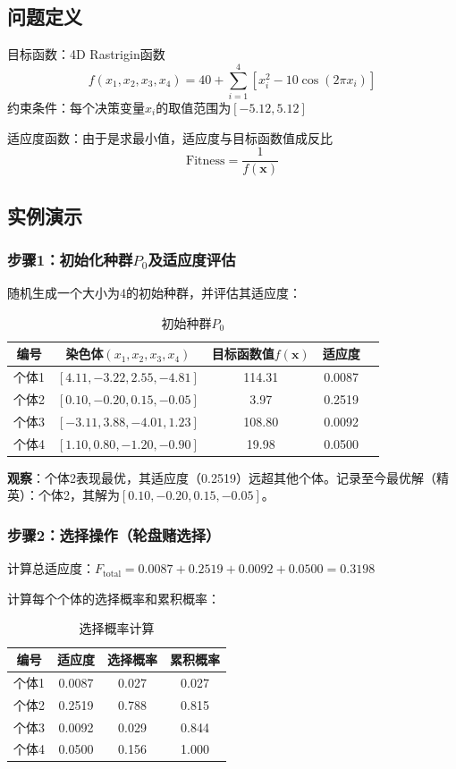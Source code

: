 \subsection{问题定义}

目标函数：4D Rastrigin函数
\[
f(x_1, x_2, x_3, x_4) = 40 + \sum_{i=1}^{4} [x_i^2 - 10 \cos(2\pi x_i)]
\]
约束条件：每个决策变量$x_i$的取值范围为$[-5.12, 5.12]$

适应度函数：由于是求最小值，适应度与目标函数值成反比
\[
\text{Fitness} = \frac{1}{f(\mathbf{x})}
\]

\subsection{实例演示}

\subsubsection{步骤1：初始化种群$P_0$及适应度评估}

随机生成一个大小为4的初始种群，并评估其适应度：

\begin{table}[H]
\centering
\caption{初始种群$P_0$}
\begin{tabular}{|c|c|c|c|c|}
\hline
编号 & 染色体$(x_1, x_2, x_3, x_4)$ & 目标函数值$f(\mathbf{x})$ & 适应度 \\
\hline
个体1 & $[4.11, -3.22, 2.55, -4.81]$ & 114.31 & 0.0087 \\
\hline
个体2 & $[0.10, -0.20, 0.15, -0.05]$ & 3.97 & 0.2519 \\
\hline
个体3 & $[-3.11, 3.88, -4.01, 1.23]$ & 108.80 & 0.0092 \\
\hline
个体4 & $[1.10, 0.80, -1.20, -0.90]$ & 19.98 & 0.0500 \\
\hline
\end{tabular}
\end{table}

\textbf{观察}：个体2表现最优，其适应度（0.2519）远超其他个体。记录至今最优解（精英）：个体2，其解为$[0.10, -0.20, 0.15, -0.05]$。

\subsubsection{步骤2：选择操作（轮盘赌选择）}

计算总适应度：$F_{\text{total}} = 0.0087 + 0.2519 + 0.0092 + 0.0500 = 0.3198$

计算每个个体的选择概率和累积概率：

\begin{table}[H]
\centering
\caption{选择概率计算}
\begin{tabular}{|c|c|c|c|}
\hline
编号 & 适应度 & 选择概率 & 累积概率 \\
\hline
个体1 & 0.0087 & 0.027 & 0.027 \\
\hline
个体2 & 0.2519 & 0.788 & 0.815 \\
\hline
个体3 & 0.0092 & 0.029 & 0.844 \\
\hline
个体4 & 0.0500 & 0.156 & 1.000 \\
\hline
\end{tabular}
\end{table}


